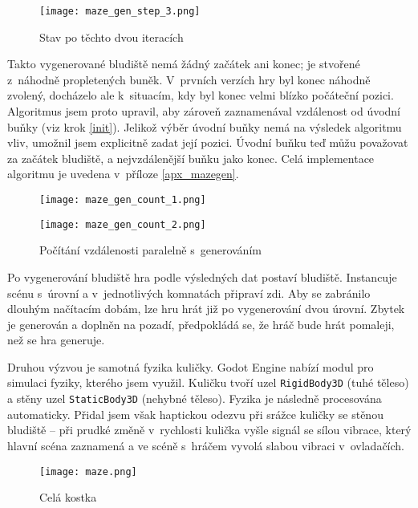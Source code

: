 \begin{figure}[H]
  \centering
  \texttt{[image: maze\_gen\_step\_3.png]}
  \caption{Stav po těchto dvou iteracích}
\end{figure}

Takto vygenerované bludiště nemá žádný začátek ani konec; je stvořené z~náhodně propletených buněk. V~prvních verzích hry byl konec náhodně zvolený, docházelo ale k~situacím, kdy byl konec velmi blízko počáteční pozici. Algoritmus jsem proto upravil, aby zároveň zaznamenával vzdálenost od úvodní buňky (viz krok \ref{init}). Jelikož výběr úvodní buňky nemá na výsledek algoritmu vliv, umožnil jsem explicitně zadat její pozici. Úvodní buňku teď můžu považovat za začátek bludiště, a nejvzdálenější buňku jako konec. Celá implementace algoritmu je uvedena v~příloze \ref{apx_mazegen}.

\begin{figure}[H]
  \centering

  \begin{minipage}{.5\textwidth}
    \centering
    \texttt{[image: maze\_gen\_count\_1.png]}
  \end{minipage}%
  \begin{minipage}{.5\textwidth}
    \centering
    \texttt{[image: maze\_gen\_count\_2.png]}
  \end{minipage}

  \caption{Počítání vzdálenosti paralelně s~generováním}
\end{figure}

Po vygenerování bludiště hra podle výsledných dat postaví bludiště. Instancuje scénu s~úrovní a v~jednotlivých komnatách připraví zdi. Aby se zabránilo dlouhým načítacím dobám, lze hru hrát již po vygenerování dvou úrovní. Zbytek je generován a doplněn na pozadí, předpokládá se, že hráč bude hrát pomaleji, než se hra generuje.

Druhou výzvou je samotná fyzika kuličky. Godot Engine nabízí modul pro simulaci fyziky, kterého jsem využil. Kuličku tvoří uzel \texttt{RigidBody3D} (tuhé těleso) a stěny uzel \texttt{StaticBody3D} (nehybné těleso). Fyzika je následně procesována automaticky. Přidal jsem však haptickou odezvu při srážce kuličky se stěnou bludiště -- při prudké změně v~rychlosti kulička vyšle signál se sílou vibrace, který hlavní scéna zaznamená a ve scéně s~hráčem vyvolá slabou vibraci v~ovladačích.

\begin{figure}[H]
  \centering
  \texttt{[image: maze.png]}
  \caption{Celá kostka}
  \label{maze_fig}
\end{figure}

